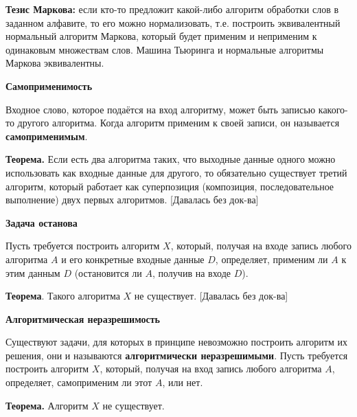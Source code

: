 \textbf{Тезис Маркова:} если кто-то предложит какой-либо алгоритм обработки слов в заданном алфавите, то его можно нормализовать, т.е. построить эквивалентный нормальный алгоритм Маркова, который будет применим и неприменим к одинаковым множествам слов.
Машина Тьюринга и нормальные алгоритмы Маркова эквивалентны.

\centerline{\textbf{Самоприменимость}}

Входное слово, которое подаётся на вход алгоритму, может быть записью какого-то другого алгоритма. Когда алгоритм применим к своей записи, он называется \textbf{самоприменимым}.

\textbf{Теорема.} Если есть два алгоритма таких, что выходные данные одного можно использовать как входные данные для другого, то обязательно существует третий алгоритм, который работает как суперпозиция (композиция, последовательное выполнение) двух первых алгоритмов. [Давалась без док-ва]


\centerline{\textbf{Задача останова}} 

Пусть требуется построить алгоритм $X$, который, получая на входе запись любого алгоритма $A$ и его конкретные входные данные $D$, определяет, применим ли $A$ к этим данным $D$ (остановится ли $A$, получив на входе $D$).
    
\textbf{Теорема}. Такого алгоритма $X$ не существует. [Давалась без док-ва]
    
\centerline{\textbf{Алгоритмическая неразрешимость}}
Существуют задачи, для которых в принципе невозможно построить алгоритм их решения, они и называются \textbf{алгоритмически неразрешимыми}. Пусть требуется построить алгоритм $X$, который, получая на вход запись любого алгоритма $A$, определяет, самоприменим ли этот $A$, или нет. 
    
\textbf{Теорема.} Алгоритм $X$ не существует.

